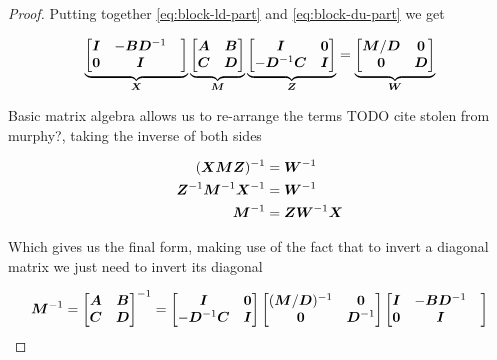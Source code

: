 \begin{proof}
  Putting together \eqref{eq:block-ld-part} and \eqref{eq:block-du-part} we get

  \begin{equation}
    \underbrace{\begin{bmatrix} {\bm{I}} & -{\bm{B}} {\bm{D}}^{-1} & \\ {\bm{0}} & {\bm{I}} \end{bmatrix}}_{{\bm{X}}}
    \underbrace{\begin{bmatrix}{\bm{A}} & {\bm{B}} \\ {\bm{C}} & {\bm{D}} \end{bmatrix}}_{{\bm{M}}}
    \underbrace{\begin{bmatrix} {\bm{I}} & {\bm{0}} \\ -{\bm{D}}^{-1} {\bm{C}} & {\bm{I}} \end{bmatrix}}_{{\bm{Z}}} =
    \underbrace{\begin{bmatrix} {\bm{M}}/{\bm{D}} & {\bm{0}} \\ {\bm{0}} & {\bm{D}} \end{bmatrix}}_{{\bm{W}}}
  \end{equation}

  Basic matrix algebra allows us to re-arrange the terms {TODO cite stolen from
  murphy?}, taking the inverse of both sides

  \begin{align}
    ({\bm{X}} {\bm{M}} {\bm{Z}})^{-1} &= {\bm{W}}^{-1} \\
    {\bm{Z}}^{-1} {\bm{M}}^{-1} {\bm{X}}^{-1} &= {\bm{W}}^{-1} \\
    {\bm{M}}^{-1} &= {\bm{Z}} {\bm{W}}^{-1} {\bm{X}}
  \end{align}

  Which gives us the final form, making use of the fact that to invert a
  diagonal matrix we just need to invert its diagonal

  \begin{equation} \label{eq:block-inverse}
    {\bm{M}}^{-1} = \begin{bmatrix} {\bm{A}} & {\bm{B}} \\ {\bm{C}} & {\bm{D}} \end{bmatrix}^{-1} =
    \begin{bmatrix} {\bm{I}} & {\bm{0}} \\ -{\bm{D}}^{-1} {\bm{C}} & {\bm{I}} \end{bmatrix}
    \begin{bmatrix} ({\bm{M}}/{\bm{D}})^{-1} & {\bm{0}} \\ {\bm{0}} & {\bm{D}}^{-1} \end{bmatrix}
    \begin{bmatrix} {\bm{I}} & -{\bm{B}} {\bm{D}}^{-1} & \\ {\bm{0}} & {\bm{I}} \end{bmatrix}
  \end{equation}

\end{proof}



